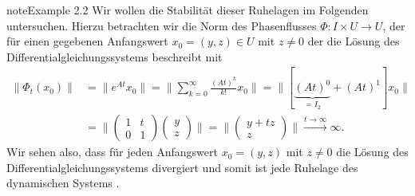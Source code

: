 \documentclass[letterpaper,10pt,english]{jupyterBook}
\begin{document}
\begin{sphinxadmonition}{note}{Example 2.2}
\sphinxAtStartPar
Wir wollen die Stabilität dieser Ruhelagen im Folgenden untersuchen.
Hierzu betrachten wir die Norm des Phasenflusses \(\Phi \colon I \times U \rightarrow U\), der für einen gegebenen Anfangswert \(x_0 = (y,z) \in U\) mit \(z \neq 0\) der die Lösung des Differentialgleichungssystems beschreibt mit
\begin{equation*}
\begin{split}\| \Phi_t(x_0) \| &= \| e^{At}x_0 \| = \| \sum_{k=0}^\infty \frac{(At)^k}{k!} x_0\| = \| [\underbrace{(At)^0}_{=I_2} + (At)^1] x_0\| \\
&= \| \begin{pmatrix} 1 & t \\ 0 & 1\end{pmatrix}\begin{pmatrix} y \\ z \end{pmatrix} \| = \| \begin{pmatrix} y + tz \\ z\end{pmatrix} \| \overset{t\to \infty}{\longrightarrow} \infty.\end{split}
\end{equation*}
\sphinxAtStartPar
Wir sehen also, dass für jeden Anfangswert \(x_0 = (y,z)\) mit \(z \neq 0\) die Lösung des Differentialgleichungssystems divergiert und somit ist jede Ruhelage des dynamischen Systems .
\end{sphinxadmonition}
\end{document}
